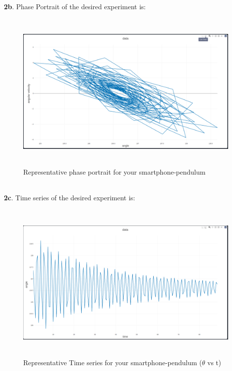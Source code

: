 \documentclass[11pt]{scrartcl} %
\begin{document}
\newpage
\textbf{2b}.
Phase Portrait of the desired experiment is:
\begin{figure}[h] %
	\centering
	\includegraphics[width=12cm, height=8cm]{Anshul_2b.PNG} %
	\caption {Representative phase portrait for your smartphone-pendulum}
\end{figure}

\\
\textbf{2c}.
Time series of the desired experiment is:
\begin{figure}[h] %
	\centering
	\includegraphics[width=12cm, height=8cm]{Anshul_2c.PNG} %
	\caption {Representative Time series for your smartphone-pendulum ($\theta$ vs t)}
\end{figure}
\end{document}
